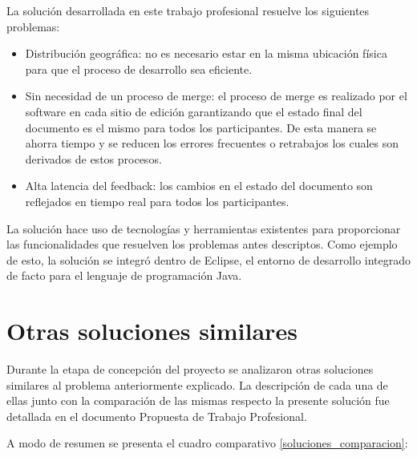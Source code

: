 \documentclass[12pt,a4paper]{article}
\begin{document}
La solución desarrollada en este trabajo profesional resuelve los siguientes problemas:

\begin{itemize}
	\item Distribución geográfica: no es necesario estar en la misma ubicación física para que el proceso
	de desarrollo sea eficiente.
	\item Sin necesidad de un proceso de merge: el proceso de merge es realizado por el software en cada
	sitio de edición garantizando que el estado final del documento es el mismo para todos los 
	participantes. De esta manera se ahorra tiempo y se reducen los errores frecuentes o retrabajos
	los cuales son derivados de estos procesos.
	\item Alta latencia del feedback: los cambios en el estado del documento son reflejados en tiempo 
	real para todos los participantes.
\end{itemize}

La solución hace uso de tecnologías y herramientas existentes para proporcionar las funcionalidades 
que resuelven los problemas antes descriptos. Como ejemplo de esto, la solución se integró dentro de
Eclipse, el entorno de desarrollo integrado de facto para el lenguaje de programación Java.

	\section{Otras soluciones similares}
Durante la etapa de concepción del proyecto se analizaron otras soluciones similares al problema
anteriormente explicado. La descripción de cada una de ellas junto con la comparación de las mismas
respecto la presente solución fue detallada en el documento Propuesta de Trabajo Profesional\cite{propuestatpprof}.

A modo de resumen se presenta el cuadro comparativo \ref{soluciones_comparacion}:
\end{document}
